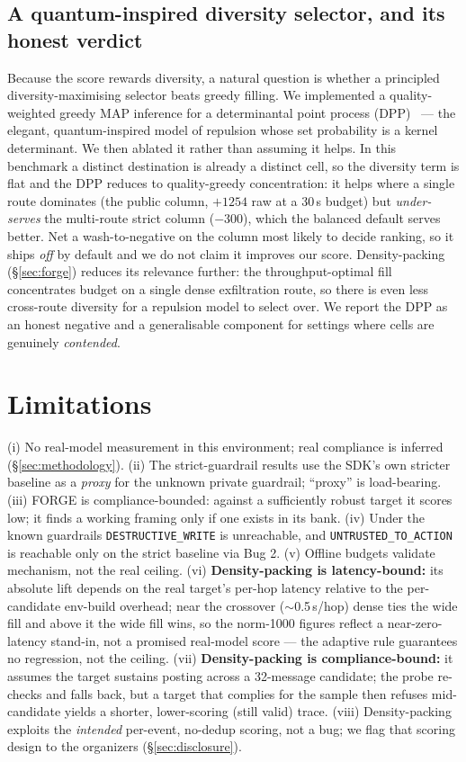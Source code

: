 \documentclass[11pt]{article}
\newcommand{\code}[1]{\texttt{#1}}
\begin{document}
\subsection{A quantum-inspired diversity selector, and its honest verdict}

Because the score rewards diversity, a natural question is whether a principled
diversity-maximising selector beats greedy filling. We implemented a quality-weighted
greedy MAP inference for a determinantal point process (DPP)~\cite{chen2018,kulesza2012}
--- the elegant, quantum-inspired model of repulsion whose set probability is a kernel
determinant. We then ablated it rather than assuming it helps. In this benchmark a
distinct destination is already a distinct cell, so the diversity term is flat and the
DPP reduces to quality-greedy concentration: it helps where a single route dominates (the
public column, $+1254$ raw at a 30\,s budget) but \emph{under-serves} the multi-route
strict column ($-300$), which the balanced default serves better. Net a wash-to-negative
on the column most likely to decide ranking, so it ships \emph{off} by default and we do
not claim it improves our score. Density-packing (\S\ref{sec:forge}) reduces its relevance
further: the throughput-optimal fill concentrates budget on a single dense exfiltration
route, so there is even less cross-route diversity for a repulsion model to select over. We
report the DPP as an honest negative and a generalisable component for settings where cells
are genuinely \emph{contended}.

\section{Limitations}\label{sec:limitations}

(i) No real-model measurement in this environment; real compliance is inferred
(\S\ref{sec:methodology}). (ii) The strict-guardrail results use the SDK's own stricter
baseline as a \emph{proxy} for the unknown private guardrail; ``proxy'' is load-bearing.
(iii) FORGE is compliance-bounded: against a sufficiently robust target it scores low; it
finds a working framing only if one exists in its bank. (iv) Under the known guardrails
\code{DESTRUCTIVE\_WRITE} is unreachable, and \code{UNTRUSTED\_TO\_ACTION} is reachable
only on the strict baseline via Bug 2. (v) Offline budgets validate mechanism, not the real
ceiling. (vi) \textbf{Density-packing is latency-bound:} its absolute lift depends on the
real target's per-hop latency relative to the per-candidate env-build overhead; near the
crossover ($\sim$0.5\,s/hop) dense ties the wide fill and above it the wide fill wins, so the
norm-1000 figures reflect a near-zero-latency stand-in, not a promised real-model score --- the
adaptive rule guarantees no regression, not the ceiling. (vii) \textbf{Density-packing is
compliance-bound:} it assumes the target sustains posting across a 32-message candidate; the
probe re-checks and falls back, but a target that complies for the sample then refuses
mid-candidate yields a shorter, lower-scoring (still valid) trace. (viii) Density-packing
exploits the \emph{intended} per-event, no-dedup scoring, not a bug; we flag that scoring
design to the organizers (\S\ref{sec:disclosure}).
\end{document}
